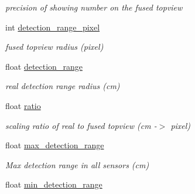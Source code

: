 \begin{DoxyCompactItemize}
\begin{DoxyCompactList}\small\item\em precision of showing number on the fused topview \end{DoxyCompactList}\item 
\hypertarget{class_sensor_info_a177c1c97b1505d80645aee801e5cf34c}{}int \hyperlink{class_sensor_info_a177c1c97b1505d80645aee801e5cf34c}{detection\+\_\+range\+\_\+pixel}\label{class_sensor_info_a177c1c97b1505d80645aee801e5cf34c}

\begin{DoxyCompactList}\small\item\em fused topview radius (pixel) \end{DoxyCompactList}\item 
\hypertarget{class_sensor_info_ae385659398e7d5c3006e5c63fa3830e4}{}float \hyperlink{class_sensor_info_ae385659398e7d5c3006e5c63fa3830e4}{detection\+\_\+range}\label{class_sensor_info_ae385659398e7d5c3006e5c63fa3830e4}

\begin{DoxyCompactList}\small\item\em real detection range radius (cm) \end{DoxyCompactList}\item 
\hypertarget{class_sensor_info_a5df127ca34d022ea03d4fbc9c143b585}{}float \hyperlink{class_sensor_info_a5df127ca34d022ea03d4fbc9c143b585}{ratio}\label{class_sensor_info_a5df127ca34d022ea03d4fbc9c143b585}

\begin{DoxyCompactList}\small\item\em scaling ratio of real to fused topview (cm -\/$>$ pixel) \end{DoxyCompactList}\item 
\hypertarget{class_sensor_info_acd4a4956498a8f4ec85b9ad17c0a2f79}{}float \hyperlink{class_sensor_info_acd4a4956498a8f4ec85b9ad17c0a2f79}{max\+\_\+detection\+\_\+range}\label{class_sensor_info_acd4a4956498a8f4ec85b9ad17c0a2f79}

\begin{DoxyCompactList}\small\item\em Max detection range in all sensors (cm) \end{DoxyCompactList}\item 
\hypertarget{class_sensor_info_ae2f24601b377681e2cddd0c0c4ecb974}{}float \hyperlink{class_sensor_info_ae2f24601b377681e2cddd0c0c4ecb974}{min\+\_\+detection\+\_\+range}\label{class_sensor_info_ae2f24601b377681e2cddd0c0c4ecb974}


\end{DoxyCompactItemize}
